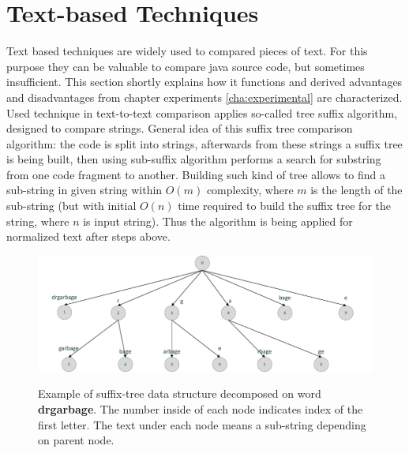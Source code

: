 \documentclass{report}
\begin{document}
\section{Text-based Techniques}
\label{sec: text_tech}
Text based techniques are widely used to compared pieces of text. For this purpose they can be valuable to compare java source code, but sometimes insufficient. This section shortly explains how it functions and derived advantages and disadvantages from chapter experiments \ref{cha:experimental} are characterized. Used technique in text-to-text comparison applies so-called tree suffix algorithm, designed to compare strings. General idea of this suffix tree comparison algorithm: the code is split into strings, afterwards from these strings a suffix tree is being built, then using sub-suffix algorithm performs a search for substring from one code fragment to another. Building such kind of tree allows to find a sub-string in given string within $O(m)$ complexity, where $m$ is the length of the sub-string (but with initial $O(n)$ time required to build the suffix tree for the string, where $n$ is input string). Thus the algorithm is being applied for normalized text after steps above. 
\vspace{5mm}
\begin{figure}[h]
  \centering
  \includegraphics[scale=0.65]{Figures/exist-alg/suffix-tree.pdf}\\[0.1cm]
  \caption[Example of suffix-tree data structure decomposed on word ]{Example of suffix-tree data structure decomposed on word \textbf{drgarbage}. The number inside of each node indicates index of the first letter. The text under each node means a sub-string depending on parent node.}
  \label{fig:suffixtreeexample}
\end{figure}
\end{document}
